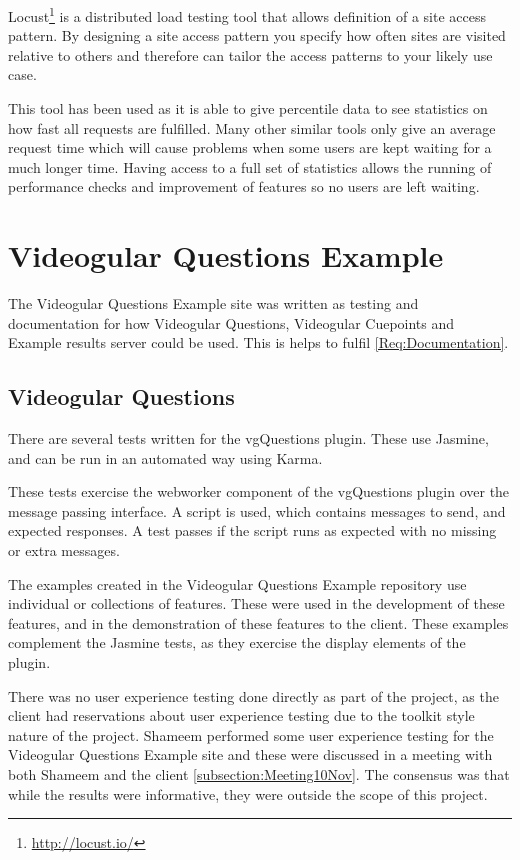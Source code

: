 Locust\footnote{\url{http://locust.io/}} is a distributed load testing tool that allows definition of a site access pattern. By designing a site access pattern you specify how often sites are visited relative to others and therefore can tailor the access patterns to your likely use case.

This tool has been used as it is able to give percentile data to see statistics on how fast all requests are fulfilled. Many other similar tools only give an average request time which will cause problems when some users are kept waiting for a much longer time. Having access to a full set of statistics allows the running of performance checks and improvement of features so no users are left waiting.

\section{Videogular Questions Example} 
\label{Section:Videogular Questions Example}

The Videogular Questions Example site was written as testing and documentation for how Videogular Questions, Videogular Cuepoints and Example results server could be used. This is helps to fulfil \cref{Req:Documentation}.

\subsection{Videogular Questions}
\label{Subsection:Videogular Questions in example}

There are several tests written for the \gls{vgQuestions} plugin. These use Jasmine, and can be run in an automated way using Karma.

These tests exercise the \gls{webworker} component of the \gls{vgQuestions} plugin over the message passing interface. A script is used, which contains messages to send, and expected responses. A test passes if the script runs as expected with no missing or extra messages.

The examples created in the Videogular Questions Example repository use individual or collections of features. These were used in the development of these features, and in the demonstration of these features to the client.  These examples complement the Jasmine tests, as they exercise the display elements of the plugin.

There was no user experience testing done directly as part of the project, as the client had reservations about user experience testing due to the toolkit style nature of the project. Shameem performed some user experience testing for the Videogular Questions Example site and these were discussed in a meeting with both Shameem and the client \autoref{subsection:Meeting10Nov}. The consensus was that while the results were informative, they were outside the scope of this project.

